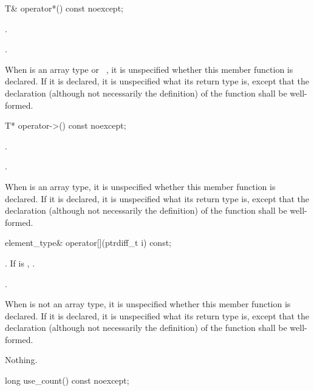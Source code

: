 %
\begin{itemdecl}
T& operator*() const noexcept;
\end{itemdecl}

\begin{itemdescr}
\pnum\requires  {}.

\pnum\returns  {}.

\pnum\remarks When  is an array type or \cv{}~,
it is unspecified whether this
member function is declared. If it is declared, it is unspecified what its
return type is, except that the declaration (although not necessarily the
definition) of the function shall be well-formed.
\end{itemdescr}

%
\begin{itemdecl}
T* operator->() const noexcept;
\end{itemdecl}

\begin{itemdescr}
\pnum\requires  {}.

\pnum\returns  {}.

\pnum\remarks When  is an array type,
it is unspecified whether this member function is declared.
If it is declared, it is unspecified what its return type is,
except that the declaration (although not necessarily the definition)
of the function shall be well-formed.
\end{itemdescr}

%
\begin{itemdecl}
element_type& operator[](ptrdiff_t i) const;
\end{itemdecl}

\begin{itemdescr}
\pnum\requires {}.
If  is , .

\pnum\returns {}.

\pnum\remarks When  is not an array type,
it is unspecified whether this member function is declared.
If it is declared, it is unspecified what its return type is,
except that the declaration (although not necessarily the definition)
of the function shall be well-formed.

\pnum\throws Nothing.
\end{itemdescr}

%
\begin{itemdecl}
long use_count() const noexcept;
\end{itemdecl}

